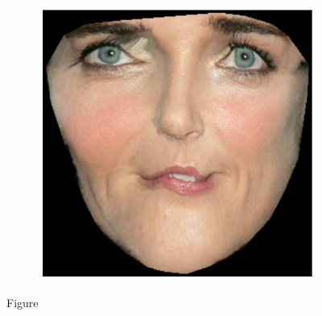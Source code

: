 \begin{figure}[h!]
\begin{subfigure}[b]{0.1\textwidth}
    \end{subfigure}
    \hfill
    \begin{subfigure}[b]{0.1\textwidth}
            \includegraphics[width=\textwidth]{resources/Fig_Draw/test_04_of}
    \end{subfigure}
    \caption{Figure}
    \label{fig:draw}
\end{figure}

\clearpage